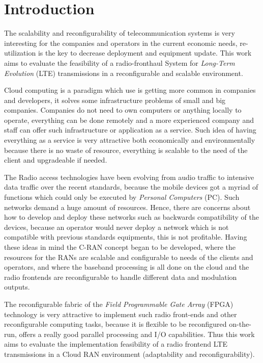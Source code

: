 \chapter{Introduction}
\label{chap:intro}

The scalability and reconfigurability of telecommunication systems is very
interesting for the companies and operators in the current economic needs,
re-utilization is the key to decrease deployment and equipment update. This work
aims to evaluate the feasibility of a radio-fronthaul System for
\textit{Long-Term Evolution} (LTE) transmissions in a reconfigurable and scalable
environment.

Cloud computing is a paradigm which use is getting more common in companies and
developers, it solves some infrastructure problems of small and big companies.
Companies do not need to own computers or anything locally to operate,
everything can be done remotely and a more experienced company and staff can
offer such infrastructure or application as a service. Such idea of having
everything as a service is very attractive both economically  and
environmentally because there is no waste of resource, everything is scalable to
the need of the client and upgradeable if needed.

The Radio access technologies have been evolving from audio traffic to intensive
data traffic over the recent standards, because the mobile devices got a myriad
of functions which could only be executed by \textit{Personal Computers} (PC).
Such networks demand a huge amount of resources. Hence, there are concerns about
how to develop and deploy these networks such as backwards compatibility of the
devices, because an operator would never deploy a network which is not
compatible with previous standards equipments, this is not profitable. Having
these ideas in mind the C-RAN concept began to be developed,  where the
resources for the RANs are scalable and configurable to needs of the clients and
operators, and where the baseband processing is all done on the cloud and the
radio frontends are reconfigurable to handle different data and modulation
outputs.

The reconfigurable fabric of the \textit{Field Programmable Gate Array} (FPGA)
technology is very attractive to implement such radio front-ends and other
reconfigurable computing tasks, because it is flexible to be reconfigured
on-the-run, offers a really good parallel processing and I/O capabilities. Thus
this work aims to evaluate the implementation feasibility of a radio frontend
LTE transmissions in a Cloud RAN environment (adaptability and
reconfigurability).

